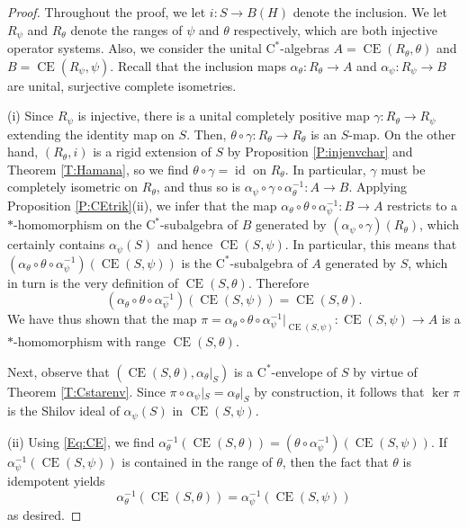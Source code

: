 \documentclass[10pt]{amsart}
\newcommand{\rC}{\mathrm{C}}
\newcommand{\CE}{\operatorname{CE}}
\newcommand{\id}{\operatorname{id}}
\theoremstyle{definition}
\begin{document}
\begin{proof}
Throughout the proof, we let $i:S\to B(H)$ denote the inclusion. We  let $R_\psi$ and $R_\theta$ denote the ranges of $\psi$ and $\theta$ respectively, which are both injective operator systems. Also, we consider the unital $\rC^*$-algebras $A=\CE(R_\theta,\theta)$ and $B=\CE(R_\psi,\psi)$. Recall that the inclusion maps $\alpha_\theta:R_\theta \to A$ and $\alpha_\psi:R_\psi\to B$ are unital, surjective complete isometries.

(i) Since $R_\psi$ is  injective, there is a unital completely positive map $\gamma:R_\theta\to R_\psi$ extending the identity map on $S$. Then, $ \theta\circ \gamma  :R_\theta\to R_\theta$ is an $S$-map. On the other hand, $(R_\theta,i)$ is a rigid extension of $S$ by Proposition \ref{P:injenvchar} and Theorem \ref{T:Hamana}, so we find $\theta\circ \gamma=\id$ on $R_\theta$. In particular, $\gamma$ must be completely isometric on $R_\theta$, and thus so is $\alpha_\psi \circ \gamma\circ \alpha_\theta^{-1}:A\to B$. Applying Proposition \ref{P:CEtrik}(ii), we infer that the map $\alpha_\theta\circ \theta\circ \alpha_\psi^{-1}:B\to A$ restricts to a $*$-homomorphism on the $\rC^*$-subalgebra of $B$ generated by $(\alpha_\psi\circ \gamma)(R_\theta)$, which certainly contains $\alpha_\psi(S)$ and hence $\CE(S,\psi)$. 
In particular, this means that $(\alpha_\theta\circ \theta\circ \alpha_\psi^{-1})(\CE(S,\psi))$ is the $\rC^*$-subalgebra of $A$ generated by $S$, which in turn is the very definition of $\CE(S,\theta)$. Therefore 
\begin{equation}\label{Eq:CE}
(\alpha_\theta\circ \theta\circ \alpha_\psi^{-1})(\CE(S,\psi))=\CE(S,\theta).
\end{equation}
We have thus shown that the map $\pi=\alpha_\theta\circ \theta\circ \alpha_\psi^{-1}|_{\CE(S,\psi)}:\CE(S,\psi)\to A$ is a $*$-homomorphism with range $\CE(S,\theta)$.

Next, observe that $(\CE(S,\theta),\alpha_\theta|_S)$ is a $\rC^*$-envelope of $S$ by virtue of Theorem \ref{T:Cstarenv}. Since $\pi\circ \alpha_\psi|_S=\alpha_\theta|_S$ by construction, it follows that $\ker \pi$ is the Shilov ideal of $\alpha_\psi(S)$ in $\CE(S,\psi)$.



(ii) Using \eqref{Eq:CE}, we find $\alpha_\theta^{-1}(\CE(S,\theta))=(\theta\circ\alpha_\psi^{-1})(\CE(S,\psi))$. If $\alpha_\psi^{-1}(\CE(S,\psi))$ is contained in the range of $\theta$, then the fact that $\theta$ is idempotent yields
\[
\alpha_\theta^{-1}(\CE(S,\theta))=\alpha_\psi^{-1}(\CE(S,\psi))
\]
as desired.


\end{proof}
\end{document}
